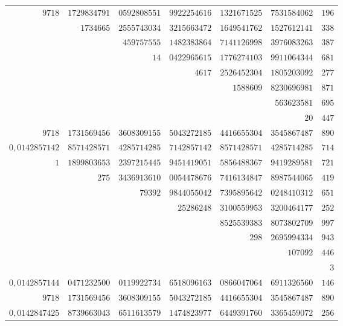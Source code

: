 \begin{longtable}{@{}rrrrrrr@{}}
\hline
$9718$ & $1729834791$ & $0592808551$ & $9922254616$ & $1321671525$ & $7531584062$ & $196$\\
 & $1734665$ & $2555743034$ & $3215663472$ & $1649541762$ & $1527612141$ & $338$\\
 &  & $459757555$ & $1482383864$ & $7141126998$ & $3976083263$ & $387$\\
 &  & $14$ & $0422965615$ & $1776274103$ & $9911064344$ & $681$\\
 &  &  & $4617$ & $2526452304$ & $1805203092$ & $277$\\
 &  &  &  & $1588609$ & $8230696981$ & $871$\\
 &  &  &  &  & $563623581$ & $695$\\
 &  &  &  &  & $20$ & $447$\\
\hline
$9718$ & $1731569456$ & $3608309155$ & $5043272185$ & $4416655304$ & $3545867487$ & $890$\\
\hline
$0{,}0142857142$ & $8571428571$ & $4285714285$ & $7142857142$ & $8571428571$ & $4285714285$ & $714$\\
$1$ & $1899803653$ & $2397215445$ & $9451419051$ & $5856488367$ & $9419289581$ & $721$\\
 & $275$ & $3436913610$ & $0054478676$ & $7416134847$ & $8987544065$ & $419$\\
 &  & $79392$ & $9844055042$ & $7395895642$ & $0248410312$ & $651$\\
 &  &  & $25286248$ & $3100559953$ & $3200464177$ & $252$\\
 &  &  &  & $8525539383$ & $8073802709$ & $997$\\
 &  &  &  & $298$ & $2695994334$ & $943$\\
 &  &  &  &  & $107092$ & $446$\\
 &  &  &  &  &  & $3$\\
\hline
$0{,}0142857144$ & $0471232500$ & $0119922734$ & $6518096163$ & $0866047064$ & $6911326560$ & $146$\\
$9718$ & $1731569456$ & $3608309155$ & $5043272185$ & $4416655304$ & $3545867487$ & $890$\\
\hline
$0{,}0142847425$ & $8739663043$ & $6511613579$ & $1474823977$ & $6449391760$ & $3365459072$ & $256$\\
\end{longtable}\endgroup
